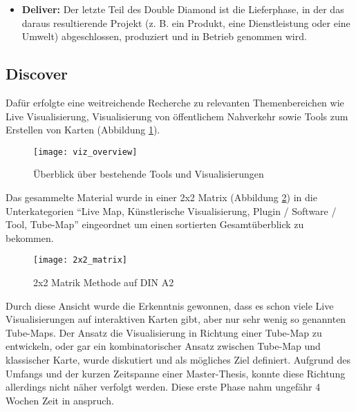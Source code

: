 \begin{newpage}
\begin{itemize}[label={}]
      \item \textbf{Deliver:} Der letzte Teil des Double Diamond ist die Lieferphase, in der das daraus resultierende Projekt (z. B. ein Produkt, eine Dienstleistung oder eine Umwelt) abgeschlossen, produziert und in Betrieb genommen wird.
    \end{itemize}
    

    \subsection{Discover}
    \label{sub:discover}
      Dafür erfolgte eine weitreichende Recherche zu relevanten Themenbereichen wie Live Visualisierung, Visualisierung von öffentlichem Nahverkehr sowie Tools zum Erstellen von Karten (Abbildung \ref{fig:viz_overview}). 

      \begin{figure}[ht]
        \begin{center}
          \texttt{[image: viz\_overview]}
          \caption{Überblick über bestehende Tools und Visualisierungen}
          \label{fig:viz_overview}
        \end{center}
      \end{figure}

      Das gesammelte Material wurde in einer 2x2 Matrix (Abbildung \ref{fig:2x2_matrix}) in die Unterkategorien "`Live Map, Künstlerische Visualisierung, Plugin / Software / Tool, Tube-Map"' eingeordnet um einen sortierten Gesamtüberblick zu bekommen. 

      \begin{figure}[htbp]
        \begin{center}
          \texttt{[image: 2x2\_matrix]}
          \caption{2x2 Matrik Methode auf DIN A2}
          \label{fig:2x2_matrix}
        \end{center}
      \end{figure}

      Durch diese Ansicht wurde die Erkenntnis gewonnen, dass es schon viele Live Visualisierungen auf interaktiven Karten gibt, aber nur sehr wenig so genannten Tube-Maps. Der Ansatz die Visualisierung in Richtung einer Tube-Map zu entwickeln, oder gar ein kombinatorischer Ansatz zwischen Tube-Map und klassischer Karte, wurde diskutiert und als mögliches Ziel definiert. Aufgrund des Umfangs und der kurzen Zeitspanne einer Master-Thesis, konnte diese Richtung allerdings nicht näher verfolgt werden. Diese erste Phase nahm ungefähr 4 Wochen Zeit in anspruch.
      

\end{newpage}
